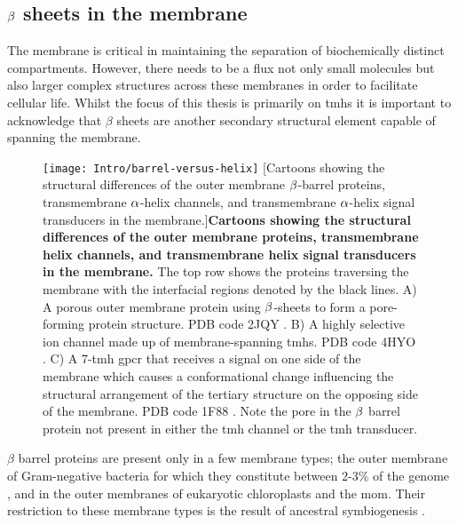 \subsection{$\protect\beta$ sheets in the membrane}

The membrane is critical in maintaining the separation of biochemically distinct compartments.
However, there needs to be a flux not only small molecules but also larger complex structures across these membranes in order to facilitate cellular life.
Whilst the focus of this thesis is primarily on \gls{tmh}s it is important to acknowledge that $\beta$ sheets are another secondary structural element capable of spanning the membrane.

\begin{figure}[ht]
\centering
\texttt{[image: Intro/barrel-versus-helix]}
		[Cartoons showing the structural differences of the outer membrane $\protect\beta$\--barrel proteins, transmembrane $\protect\alpha$\--helix channels, and transmembrane $\protect\alpha$\--helix signal transducers in the membrane.]{\textbf{Cartoons showing the structural differences of the outer membrane proteins, transmembrane helix channels, and transmembrane helix signal transducers in the membrane.}
		The top row shows the proteins traversing the membrane with the interfacial regions denoted by the black lines.
		A) A porous outer membrane protein using $\protect\beta$\--sheets to form a pore\--forming protein structure.
		PDB code 2JQY \cite{Liang2007}.
		B) A highly selective ion channel made up of membrane\--spanning \gls{tmh}s.
		PDB code 4HYO \cite{Posson2013}.
		C) A 7\--\gls{tmh} \gls{gpcr} that receives a signal on one side of the membrane which causes a conformational change influencing the structural arrangement of the tertiary structure on the opposing side of the membrane.
		PDB code 1F88 \cite{Palczewski2000}.
		Note the pore in the $\protect\beta$ barrel protein not present in either the \gls{tmh} channel or the \gls{tmh} transducer.
		}
\label{fig:barrel-versus-helix}
\end{figure}

$\beta$ barrel proteins are present only in a few membrane types; the outer membrane of Gram\--negative bacteria for which they constitute between 2-3\% of the genome \cite{Wimley2003}, and in the outer membranes of eukaryotic chloroplasts and the \gls{mom}.
Their restriction to these membrane types is the result of ancestral symbiogenesis \cite{McFadden2001, Gray1999, Fischer1994, Zeth2010, Fairman2011, Ulrich2015}.

